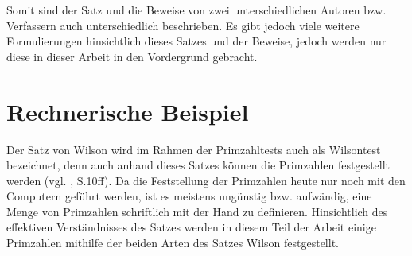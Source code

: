 Somit sind der Satz und die Beweise von zwei unterschiedlichen
Autoren bzw. Verfassern auch unterschiedlich beschrieben.
Es gibt jedoch viele weitere Formulierungen hinsichtlich
dieses Satzes und der Beweise, jedoch werden nur diese in
dieser Arbeit in den Vordergrund gebracht.


\section{Rechnerische Beispiel}

Der Satz von Wilson wird im Rahmen der Primzahltests auch
als Wilsontest bezeichnet, denn auch anhand dieses Satzes
können die Primzahlen festgestellt werden (vgl. \cite{sasgabor},
S.10ff). Da die Feststellung der Primzahlen heute nur noch
mit den Computern geführt werden, ist es meistens ungünstig
bzw. aufwändig, eine Menge von Primzahlen schriftlich mit
der Hand zu definieren. Hinsichtlich des effektiven
Verständnisses des Satzes werden in diesem Teil der Arbeit
einige Primzahlen mithilfe der beiden Arten des Satzes
Wilson festgestellt.

